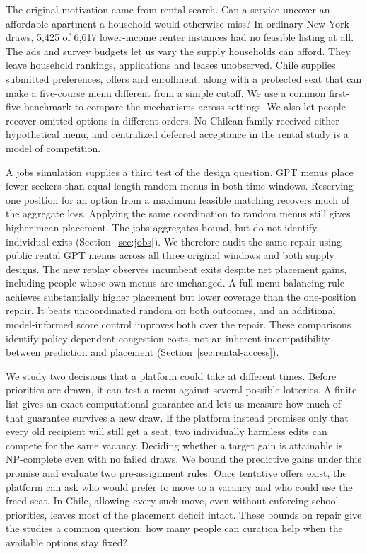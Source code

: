 \documentclass[format=acmsmall,review=false]{acmart}
\begin{document}
The original motivation came from rental search. Can a service uncover an affordable apartment a household would otherwise miss? In ordinary New York draws, 5,425 of 6,617 lower-income renter instances had no feasible listing at all. The ads and survey budgets let us vary the supply households can afford. They leave household rankings, applications and leases unobserved. Chile supplies submitted preferences, offers and enrollment, along with a protected seat that can make a five-course menu different from a simple cutoff. We use a common first-five benchmark to compare the mechanisms across settings. We also let people recover omitted options in different orders. No Chilean family received either hypothetical menu, and centralized deferred acceptance in the rental study is a model of competition.

A jobs simulation supplies a third test of the design question. GPT menus place fewer seekers than equal-length random menus in both time windows. Reserving one position for an option from a maximum feasible matching recovers much of the aggregate loss. Applying the same coordination to random menus still gives higher mean placement. The jobs aggregates bound, but do not identify, individual exits (Section~\ref{sec:jobs}). We therefore audit the same repair using public rental GPT menus across all three original windows and both supply designs. The new replay observes incumbent exits despite net placement gains, including people whose own menus are unchanged. A full-menu balancing rule achieves substantially higher placement but lower coverage than the one-position repair. It beats uncoordinated random on both outcomes, and an additional model-informed score control improves both over the repair. These comparisons identify policy-dependent congestion costs, not an inherent incompatibility between prediction and placement (Section~\ref{sec:rental-access}).

We study two decisions that a platform could take at different times. Before priorities are drawn, it can test a menu against several possible lotteries. A finite list gives an exact computational guarantee and lets us measure how much of that guarantee survives a new draw. If the platform instead promises only that every old recipient will still get a seat, two individually harmless edits can compete for the same vacancy. Deciding whether a target gain is attainable is NP-complete even with no failed draws. We bound the predictive gains under this promise and evaluate two pre-assignment rules. Once tentative offers exist, the platform can ask who would prefer to move to a vacancy and who could use the freed seat. In Chile, allowing every such move, even without enforcing school priorities, leaves most of the placement deficit intact. These bounds on repair give the studies a common question: how many people can curation help when the available options stay fixed?
\end{document}
